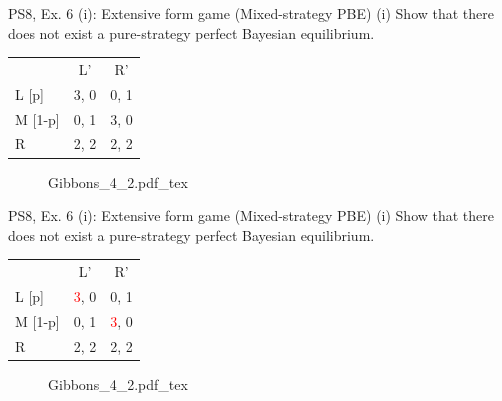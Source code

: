 \begin{frame}{PS8, Ex. 6 (i): Extensive form game (Mixed-strategy PBE)}
    (i) Show that there does not exist a pure-strategy perfect Bayesian equilibrium.
    \begin{multicols}{2}
      \begin{table}
        \begin{tabular}{l|c|c|}
          \multicolumn{1}{c}{} & \multicolumn{1}{c}{L'} & \multicolumn{1}{c}{R'} \\\cline{2-3}
          L [p]   & 3, 0 & 0, 1 \\\cline{2-3}
          M [1-p] & 0, 1 & 3, 0 \\\cline{2-3}
          R       & 2, 2 & 2, 2 \\\cline{2-3}
        \end{tabular}
      \end{table} \vspace{-4pt}
      \vfill\null\columnbreak
      \begin{figure}[!h]
        \center {}
        {Gibbons_4_2.pdf_tex}
      \end{figure}
      \vfill\null
    \end{multicols}
\end{frame}
\begin{frame}{PS8, Ex. 6 (i): Extensive form game (Mixed-strategy PBE)}
    (i) Show that there does not exist a pure-strategy perfect Bayesian equilibrium.
    \begin{multicols}{2}
      \begin{table}
        \begin{tabular}{l|c|c|}
          \multicolumn{1}{c}{} & \multicolumn{1}{c}{L'} & \multicolumn{1}{c}{R'} \\\cline{2-3}
          L [p]   & \textcolor{red}{3}, 0 & 0, \color{blue}1 \\\cline{2-3}
          M [1-p] & 0, \color{blue}1 & \textcolor{red}{3}, 0 \\\cline{2-3}
          R       & 2, \color{blue}2 & 2, \color{blue}2 \\\cline{2-3}
        \end{tabular}
      \end{table} \vspace{-4pt}
      \vfill\null\columnbreak
      \begin{figure}[!h]
        \center {}
        {Gibbons_4_2.pdf_tex}
      \end{figure}
      \vfill\null
    \end{multicols}
\end{frame}

